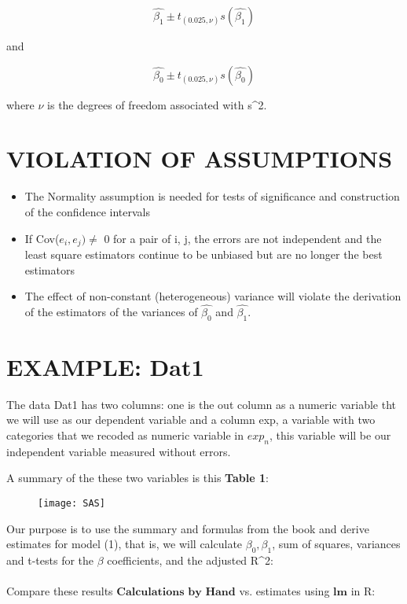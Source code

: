 \documentclass[letterpaper,11pt]{article}
\begin{document}
	\begin{equation}
	\hat{\beta_{1}} \pm t_{(0.025, \nu)} s (\hat{\beta_{1}})
	\end{equation}		
	
	and
	
	\begin{equation}
	\hat{\beta_{0}} \pm t_{(0.025, \nu)} s (\hat{\beta_{0}})
	\end{equation}		
		
			where $\nu$ is the degrees of freedom associated with s^2.
			
\section{VIOLATION OF ASSUMPTIONS}

	\begin{itemize}
		\item The Normality assumption is needed for tests of significance and construction of the confidence intervals
		\item If Cov($e_{i}, e_{j}) \neq$ 0 for a pair of i, j, the errors are not independent and the least square estimators continue to be 		
					unbiased but are no longer the best estimators
		\item The effect of non-constant (heterogeneous) variance will violate the derivation of the estimators of the variances of $\hat{\beta_{
					0}}$ and $\hat{\beta_{1}}$.	
	\end{itemize}


\section{EXAMPLE: Dat1}
	
	The data Dat1 has two columns: one is the out column as a numeric variable tht we will use as our dependent variable and a column 
	exp, a variable with two categories that we recoded as numeric variable in $exp_n$, this variable will be our independent variable 
	measured without errors.
	
	A summary of the these two variables is this \textbf{Table 1}:
	
		\begin{figure}[htbp]
		\centering
			\texttt{[image: SAS]}
	\end{figure}
	
\newpage
	
	Our purpose is to use the summary and formulas from the book and derive estimates for model (1), that is, we will calculate $\beta_{0}, 		
	\beta_{1}$, sum of squares, variances and t-tests for the $\beta$ coefficients, and the adjusted R^2:
	\\ \\
	Compare these results $\textbf{Calculations by Hand}$ vs. estimates using $\textbf{lm}$ in R:
\end{document}
